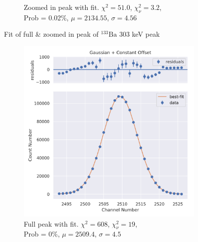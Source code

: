 \documentclass[11pt,a4paper]{article}
\newcommand{\element}[2]{$^{#2}\textrm{#1}$}
\begin{document}
\begin{figure}[H]
\begin{subfigure}{.5\linewidth}
    \caption{Zoomed in peak with fit. $\chi^2 = 51.0$, $\chi^2_\nu = 3.2$, \\ Prob = 0.02\%, $\mu = 2134.55$, $\sigma = 4.56$}
  \end{subfigure}
  \caption{Fit of full \& zoomed in peak of \element{Ba}{133} 303 keV peak}
\end{figure}
\begin{figure}[H]
  \centering
  \begin{subfigure}{.5\linewidth}
    \centering
    \includegraphics[width=\linewidth]{./Images/Barium133/Gauss/Gauss_6_Full.png}
    \caption{Full peak with fit. $\chi^2 = 608$, $\chi^2_\nu = 19$, \\ Prob = 0\%, $\mu = 2509.4$, $\sigma = 4.5$}
  \end{subfigure}%
  \begin{subfigure}{.5\linewidth}
    \centering

\end{subfigure}
\end{figure}
\end{document}
